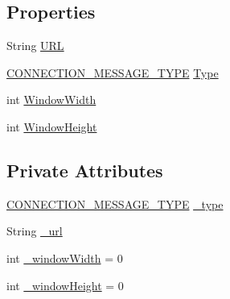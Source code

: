 \subsection*{Properties}
\begin{DoxyCompactItemize}
\item 
String \hyperlink{class_web_analyzer_1_1_models_1_1_message_model_1_1_connection_message_afc9df7636f98ce36f983c89db64f1c6a}{U\+R\+L}
\item 
\hyperlink{class_web_analyzer_1_1_models_1_1_message_model_1_1_connection_message_a0b8ebc456d3aed9c51235f2a1a1a1cdb}{C\+O\+N\+N\+E\+C\+T\+I\+O\+N\+\_\+\+M\+E\+S\+S\+A\+G\+E\+\_\+\+T\+Y\+P\+E} \hyperlink{class_web_analyzer_1_1_models_1_1_message_model_1_1_connection_message_a74c569109e3a9d19130c36fa9628a5f5}{Type}
\item 
int \hyperlink{class_web_analyzer_1_1_models_1_1_message_model_1_1_connection_message_ad41b2edd499a0085aefa4ab180de9dc7}{Window\+Width}
\item 
int \hyperlink{class_web_analyzer_1_1_models_1_1_message_model_1_1_connection_message_a945ce5486695eaed31e71e0e11e0dc64}{Window\+Height}
\end{DoxyCompactItemize}
\subsection*{Private Attributes}
\begin{DoxyCompactItemize}
\item 
\hyperlink{class_web_analyzer_1_1_models_1_1_message_model_1_1_connection_message_a0b8ebc456d3aed9c51235f2a1a1a1cdb}{C\+O\+N\+N\+E\+C\+T\+I\+O\+N\+\_\+\+M\+E\+S\+S\+A\+G\+E\+\_\+\+T\+Y\+P\+E} \hyperlink{class_web_analyzer_1_1_models_1_1_message_model_1_1_connection_message_abb086bc753b39762aede8191821e72cb}{\+\_\+type}
\item 
String \hyperlink{class_web_analyzer_1_1_models_1_1_message_model_1_1_connection_message_a8b546b2299ebc28fbe93f158a7e1742a}{\+\_\+url}
\item 
int \hyperlink{class_web_analyzer_1_1_models_1_1_message_model_1_1_connection_message_a0dd807c1966d8e6d90b0e764eacca950}{\+\_\+window\+Width} = 0
\item 
int \hyperlink{class_web_analyzer_1_1_models_1_1_message_model_1_1_connection_message_a9a2326a089eb048ce429e3bcceb54918}{\+\_\+window\+Height} = 0
\end{DoxyCompactItemize}
